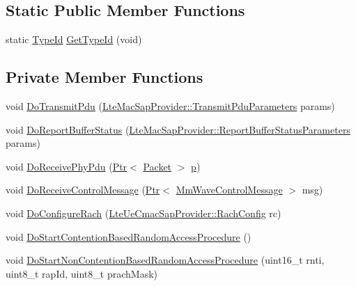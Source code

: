 \subsection*{Static Public Member Functions}
\begin{DoxyCompactItemize}
\item 
static \hyperlink{classns3_1_1TypeId}{Type\+Id} \hyperlink{classns3_1_1MmWaveUeMac_a2827e3d90d61cde96707b779d2e28579}{Get\+Type\+Id} (void)
\end{DoxyCompactItemize}
\subsection*{Private Member Functions}
\begin{DoxyCompactItemize}
\item 
void \hyperlink{classns3_1_1MmWaveUeMac_a5f228598aabf0c6cd61b6fad018512fe}{Do\+Transmit\+Pdu} (\hyperlink{structns3_1_1LteMacSapProvider_1_1TransmitPduParameters}{Lte\+Mac\+Sap\+Provider\+::\+Transmit\+Pdu\+Parameters} params)
\item 
void \hyperlink{classns3_1_1MmWaveUeMac_aa10b7cfdd045506b377066cb1f99ba77}{Do\+Report\+Buffer\+Status} (\hyperlink{structns3_1_1LteMacSapProvider_1_1ReportBufferStatusParameters}{Lte\+Mac\+Sap\+Provider\+::\+Report\+Buffer\+Status\+Parameters} params)
\item 
void \hyperlink{classns3_1_1MmWaveUeMac_a844ea147711c597c95939d41dd1ff6b2}{Do\+Receive\+Phy\+Pdu} (\hyperlink{classns3_1_1Ptr}{Ptr}$<$ \hyperlink{classns3_1_1Packet}{Packet} $>$ \hyperlink{lte__link__budget__x2__handover__measures_8m_ac9de518908a968428863f829398a4e62}{p})
\item 
void \hyperlink{classns3_1_1MmWaveUeMac_a433bc5bfb87ed49eb02989640562e395}{Do\+Receive\+Control\+Message} (\hyperlink{classns3_1_1Ptr}{Ptr}$<$ \hyperlink{classns3_1_1MmWaveControlMessage}{Mm\+Wave\+Control\+Message} $>$ msg)
\item 
void \hyperlink{classns3_1_1MmWaveUeMac_a924faf92211ad365954326e099aa0248}{Do\+Configure\+Rach} (\hyperlink{structns3_1_1LteUeCmacSapProvider_1_1RachConfig}{Lte\+Ue\+Cmac\+Sap\+Provider\+::\+Rach\+Config} rc)
\item 
void \hyperlink{classns3_1_1MmWaveUeMac_abb871cbb9f4b9ea647db42848ba98044}{Do\+Start\+Contention\+Based\+Random\+Access\+Procedure} ()
\item 
void \hyperlink{classns3_1_1MmWaveUeMac_a25e1b978cdec1d22cb804b45bd29da67}{Do\+Start\+Non\+Contention\+Based\+Random\+Access\+Procedure} (uint16\+\_\+t rnti, uint8\+\_\+t rap\+Id, uint8\+\_\+t prach\+Mask)

\end{DoxyCompactItemize}

